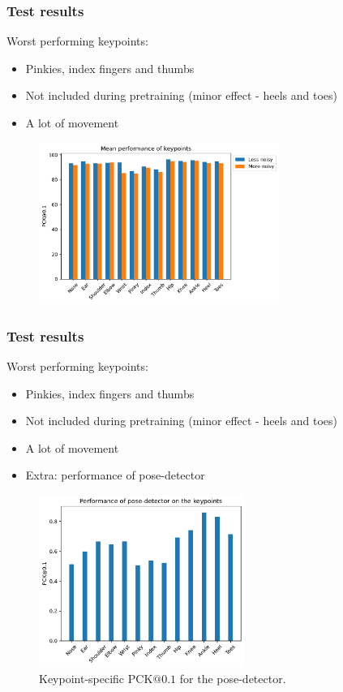 \documentclass{beamer}
\begin{document}
\begin{frame}
    \frametitle{Test results}
    Worst performing keypoints:
    \begin{itemize}
        \item Pinkies, index fingers and thumbs
        \item Not included during pretraining (minor effect - heels and toes)
        \item A lot of movement
    \end{itemize}
    \begin{figure}
        \centering
        \includegraphics[width = 0.7\textwidth]{entities/kpts.pdf}
    \end{figure}
\end{frame}

\begin{frame}
    \frametitle{Test results}
    Worst performing keypoints:
    \begin{itemize}
        \item Pinkies, index fingers and thumbs
        \item Not included during pretraining (minor effect - heels and toes)
        \item A lot of movement
        \item Extra: performance of pose-detector
    \end{itemize}
    \begin{figure}
        \centering
        \includegraphics[width = 0.6\textwidth]{entities/kpts_pose_detector.pdf}
        \caption{Keypoint-specific PCK$@0.1$ for the pose-detector.}
    \end{figure}
\end{frame}
\end{document}
